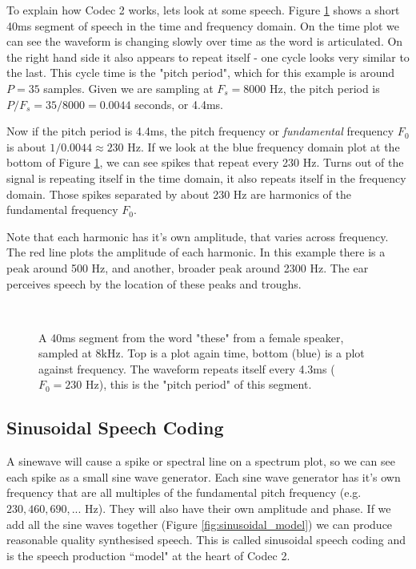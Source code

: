\documentclass{article}
\begin{document}
To explain how Codec 2 works, lets look at some speech. Figure \ref{fig:hts2a_time} shows a short 40ms segment of speech in the time and frequency domain.  On the time plot we can see the waveform is changing slowly over time as the word is articulated.  On the right hand side it also appears to repeat itself - one cycle looks very similar to the last.  This cycle time is the "pitch period", which for this example is around $P=35$ samples.  Given we are sampling at $F_s=8000$ Hz, the pitch period is $P/F_s=35/8000=0.0044$ seconds, or 4.4ms.

Now if the pitch period is 4.4ms, the pitch frequency or \emph{fundamental} frequency $F_0$ is about $1/0.0044 \approx 230$ Hz.  If we look at the blue frequency domain plot at the bottom of Figure \ref{fig:hts2a_time}, we can see spikes that repeat every 230 Hz.  Turns out of the signal is repeating itself in the time domain, it also repeats itself in the frequency domain.  Those spikes separated by about 230 Hz are harmonics of the fundamental frequency $F_0$.

Note that each harmonic has it's own amplitude, that varies across frequency.  The red line plots the amplitude of each harmonic. In this example there is a peak around 500 Hz, and another, broader peak around 2300 Hz.  The ear perceives speech by the location of these peaks and troughs.

\begin{figure}[H]
\caption{ A 40ms segment from the word "these" from a female speaker, sampled at 8kHz. Top is a plot again time, bottom (blue) is a plot against frequency. The waveform repeats itself every 4.3ms ($F_0=230$ Hz), this is the "pitch period" of this segment.}
\label{fig:hts2a_time}
\begin{center}

\\

\end{center}
\end{figure}

\subsection{Sinusoidal Speech Coding}

A sinewave will cause a spike or spectral line on a spectrum plot, so we can see each spike as a small sine wave generator.  Each sine wave generator has it's own frequency that are all multiples of the fundamental pitch frequency (e.g. $230, 460, 690,...$ Hz).  They will also have their own amplitude and phase.  If we add all the sine waves together (Figure \ref{fig:sinusoidal_model}) we can produce reasonable quality synthesised speech.  This is called sinusoidal speech coding and is the speech production ``model" at the heart of Codec 2.
\end{document}

